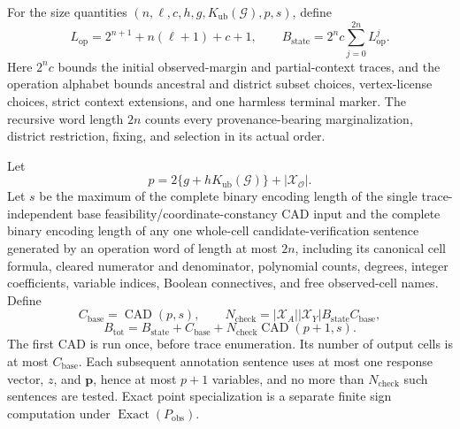 For the size quantities \((n,\ell,c,h,g,K_{\mathrm{ub}}(\mathcal G),p,s)\), define
\[
L_{\mathrm{op}}=2^{n+1}+n(\ell+1)+c+1,
\qquad
B_{\mathrm{state}}=2^n c\sum_{j=0}^{2n}L_{\mathrm{op}}^j.
\]
Here \(2^n c\) bounds the initial observed-margin and partial-context traces, and the operation alphabet bounds ancestral and district subset choices, vertex-license choices, strict context extensions, and one harmless terminal marker. The recursive word length \(2n\) counts every provenance-bearing marginalization, district restriction, fixing, and selection in its actual order.

Let
\[
p=2\{g+hK_{\mathrm{ub}}(\mathcal G)\}+|\mathcal X_{\mathcal O}|.
\]
Let \(s\) be the maximum of the complete binary encoding length of the single trace-independent base feasibility/coordinate-constancy CAD input and the complete binary encoding length of any one whole-cell candidate-verification sentence generated by an operation word of length at most \(2n\), including its canonical cell formula, cleared numerator and denominator, polynomial counts, degrees, integer coefficients, variable indices, Boolean connectives, and free observed-cell names. Define
\[
C_{\mathrm{base}}=\operatorname{CAD}(p,s),
\qquad
N_{\mathrm{check}}=|\mathcal X_A||\mathcal X_Y|B_{\mathrm{state}}C_{\mathrm{base}},
\]
\[
B_{\mathrm{tot}}=
B_{\mathrm{state}}+C_{\mathrm{base}}
+N_{\mathrm{check}}\operatorname{CAD}(p+1,s).
\]
The first CAD is run once, before trace enumeration. Its number of output cells is at most \(C_{\mathrm{base}}\). Each subsequent annotation sentence uses at most one response vector, \(z\), and \(\mathbf p\), hence at most \(p+1\) variables, and no more than \(N_{\mathrm{check}}\) such sentences are tested. Exact point specialization is a separate finite sign computation under \(\operatorname{Exact}(P_{\mathrm{obs}})\).